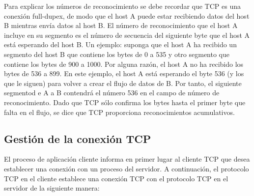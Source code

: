 \documentclass[a4paper,11pt]{article}
\begin{document}
Para explicar los números de reconocimiento se debe recordar que TCP es una conexión full-dupex, de modo que el host A puede estar recibiendo datos del host B mientras envía datos al host B. El número de reconocimiento que el host A incluye en su segmento es el número de secuencia del siguiente byte que el host A está esperando del host B. Un ejemplo: suponga que el host A ha recibido un segmento del host B que contiene los bytes de 0 a 535 y otro segmento que contiene los bytes de 900 a 1000. Por alguna razón, el host A no ha recibido los bytes de 536 a 899. En este ejemplo, el host A está esperando el byte 536 (y los que le siguen) para volver a crear el flujo de datos de B. Por tanto, el siguiente segmentod e A a B contendrá el número 536 en el campo de número de reconocimiento. Dado que TCP sólo confirma los bytes hasta el primer byte que falta en el flujo, se dice que TCP proporciona reconocimientos acumulativos.

\subsection{Gestión de la conexión TCP}
El proceso de aplicación cliente informa en primer lugar al cliente TCP que desea establecer una conexión con un proceso del servidor. A continuación, el protocolo TCP en el cliente establece una conexión TCP con el protocolo TCP en el servidor de la siguiente manera:
\end{document}
